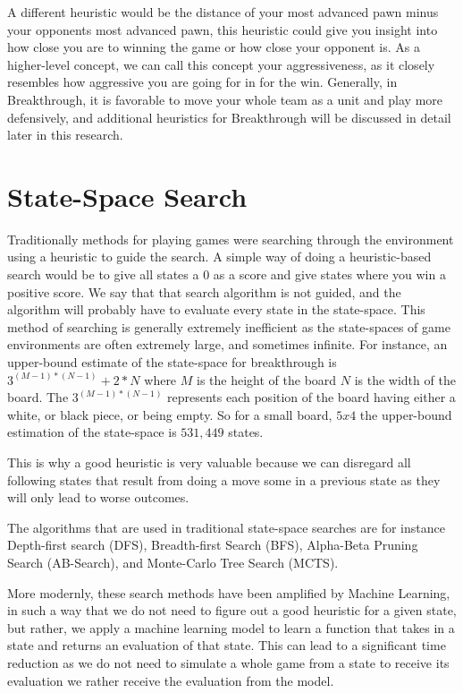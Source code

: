 A different heuristic would be the distance of your most advanced pawn minus your opponents most advanced pawn, this heuristic could give you insight into how close you are to winning the game or how close your opponent is. As a higher-level concept, we can call this concept your aggressiveness, as it closely resembles how aggressive you are going for in for the win. Generally, in Breakthrough, it is favorable to move your whole team as a unit and play more defensively, and additional heuristics for Breakthrough will be discussed in detail later in this research.

\section{State-Space Search}

Traditionally methods for playing games were searching through the environment using a heuristic to guide the search. A simple way of doing a heuristic-based search would be to give all states a $0$ as a score and give states where you win a positive score. We say that that search algorithm is not guided, and the algorithm will probably have to evaluate every state in the state-space. This method of searching is generally extremely inefficient as the state-spaces of game environments are often extremely large, and sometimes infinite. For instance, an upper-bound estimate of the state-space for breakthrough is $3^{(M-1)*(N-1)}+2*N$ where $M$ is the height of the board $N$ is the width of the board. The $3^{(M-1)*(N-1)}$ represents each position of the board having either a white, or black piece, or being empty. So for a small board, $5x4$ the upper-bound estimation of the state-space is $531,449$ states.

This is why a good heuristic is very valuable because we can disregard all following states that result from doing a move some in a previous state as they will only lead to worse outcomes.

The algorithms that are used in traditional state-space searches are for instance Depth-first search (DFS), Breadth-first Search (BFS), Alpha-Beta Pruning Search (AB-Search)\cite{abpruning:dj}, and Monte-Carlo Tree Search (MCTS).

More modernly, these search methods have been amplified by Machine Learning, in such a way that we do not need to figure out a good heuristic for a given state, but rather, we apply a machine learning model to learn a function that takes in a state and returns an evaluation of that state.\cite{neuralnetworksgames:michulke} This can lead to a significant time reduction as we do not need to simulate a whole game from a state to receive its evaluation we rather receive the evaluation from the model.


